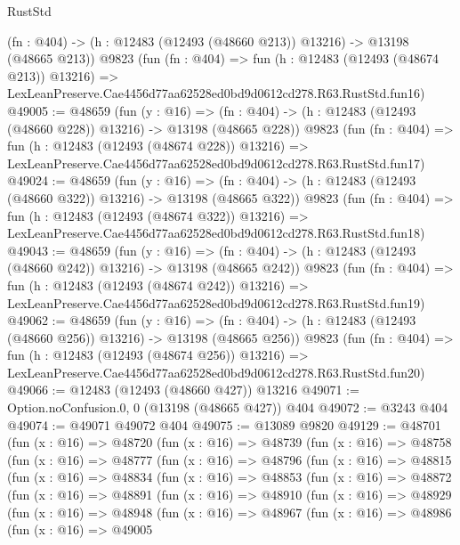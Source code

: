 \begin{lexlean}{RustStd}
\begin{coremodule}
    (fn : @404) -> (h : @12483 (@12493 (@48660 @213)) @13216) -> @13198 (@48665 @213))
    @9823
    (fun (fn : @404) =>
    fun (h : @12483 (@12493 (@48674 @213)) @13216) =>
    LexLeanPreserve.Cae4456d77aa62528ed0bd9d0612cd278.R63.RustStd.fun16)
@49005 := @48659
    (fun (y : @16) =>
    (fn : @404) -> (h : @12483 (@12493 (@48660 @228)) @13216) -> @13198 (@48665 @228))
    @9823
    (fun (fn : @404) =>
    fun (h : @12483 (@12493 (@48674 @228)) @13216) =>
    LexLeanPreserve.Cae4456d77aa62528ed0bd9d0612cd278.R63.RustStd.fun17)
@49024 := @48659
    (fun (y : @16) =>
    (fn : @404) -> (h : @12483 (@12493 (@48660 @322)) @13216) -> @13198 (@48665 @322))
    @9823
    (fun (fn : @404) =>
    fun (h : @12483 (@12493 (@48674 @322)) @13216) =>
    LexLeanPreserve.Cae4456d77aa62528ed0bd9d0612cd278.R63.RustStd.fun18)
@49043 := @48659
    (fun (y : @16) =>
    (fn : @404) -> (h : @12483 (@12493 (@48660 @242)) @13216) -> @13198 (@48665 @242))
    @9823
    (fun (fn : @404) =>
    fun (h : @12483 (@12493 (@48674 @242)) @13216) =>
    LexLeanPreserve.Cae4456d77aa62528ed0bd9d0612cd278.R63.RustStd.fun19)
@49062 := @48659
    (fun (y : @16) =>
    (fn : @404) -> (h : @12483 (@12493 (@48660 @256)) @13216) -> @13198 (@48665 @256))
    @9823
    (fun (fn : @404) =>
    fun (h : @12483 (@12493 (@48674 @256)) @13216) =>
    LexLeanPreserve.Cae4456d77aa62528ed0bd9d0612cd278.R63.RustStd.fun20)
@49066 := @12483 (@12493 (@48660 @427)) @13216
@49071 := Option.noConfusion.{0, 0} (@13198 (@48665 @427)) @404
@49072 := @3243 @404
@49074 := @49071 @49072 @404
@49075 := @13089 @9820
@49129 := @48701
    (fun (x : @16) =>
    @48720
      (fun (x : @16) =>
      @48739
        (fun (x : @16) =>
        @48758
          (fun (x : @16) =>
          @48777
            (fun (x : @16) =>
            @48796
              (fun (x : @16) =>
              @48815
                (fun (x : @16) =>
                @48834
                  (fun (x : @16) =>
                  @48853
                    (fun (x : @16) =>
                    @48872
                      (fun (x : @16) =>
                      @48891
                        (fun (x : @16) =>
                        @48910
                          (fun (x : @16) =>
                          @48929
                            (fun (x : @16) =>
                            @48948
                              (fun (x : @16) =>
                              @48967
                                (fun (x : @16) =>
                                @48986
                                  (fun (x : @16) =>
                                  @49005

\end{coremodule}
\end{lexlean}
